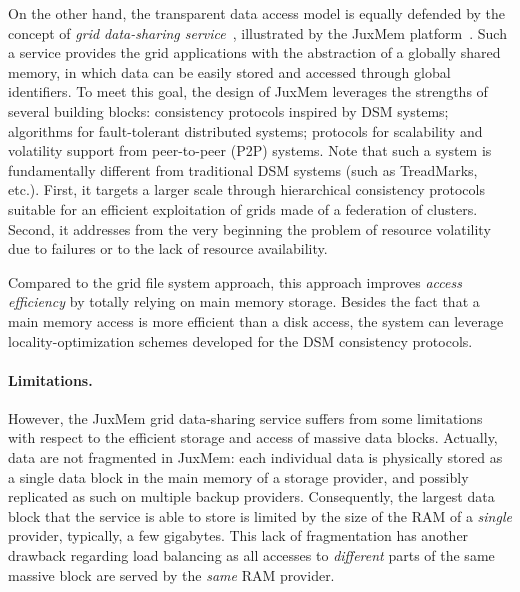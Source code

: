 \documentclass{llncs}
\begin{document}
On the other hand, the transparent data
access model is equally defended by the concept of 
\emph{grid data-sharing service}~\cite{AntBerCarDesBouJanMonSen06GDS},
illustrated by the JuxMem platform~\cite{AntBouJan05SCPE}. Such a
service provides the grid applications with the abstraction
of a globally shared memory, in which data can be easily stored and
accessed through global identifiers.  
To meet this goal, the design of
JuxMem leverages the strengths of several building blocks:
consistency protocols inspired by DSM systems; algorithms for
fault-tolerant distributed systems; protocols for scalability and
volatility support from peer-to-peer (P2P) systems. Note that such a
system is fundamentally different from traditional DSM systems 
(such as TreadMarks, etc.).
First, it targets a larger scale through hierarchical
consistency protocols suitable for an efficient exploitation of grids
made of a federation of clusters. 
Second, it addresses from the very beginning the
problem of resource volatility due to failures or to the lack of
resource availability. 

Compared to the grid file system approach, this
approach improves \emph{access efficiency} by totally relying on main
memory storage. Besides the fact that a main memory access is more
efficient than a disk access, the system can leverage
locality-optimization schemes developed for the DSM consistency
protocols.

\paragraph{Limitations.}

However, the JuxMem grid data-sharing service suffers from some
limitations with respect to the efficient storage and access of
massive data blocks. Actually, data are not fragmented in JuxMem: each
individual data is physically stored 
as a single data block in the main memory of
a storage provider, and possibly replicated as such on multiple backup 
providers. Consequently, the largest data block that the service is
able to store is limited by the size of the RAM of a \emph{single}
provider, typically, a few gigabytes. 
This lack of
fragmentation has another drawback regarding load balancing as all
accesses to \emph{different} parts of the same massive block are
served by the \emph{same} RAM provider.
\end{document}
